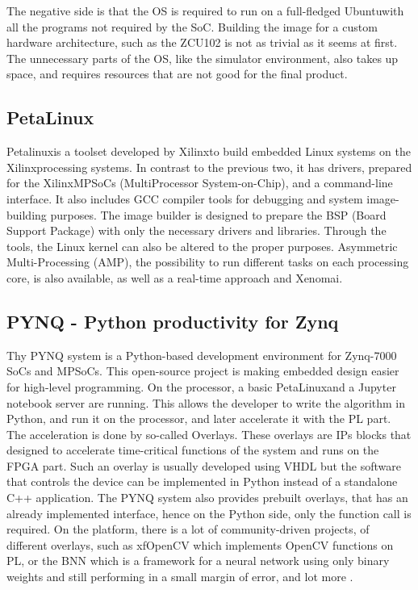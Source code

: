The negative side is that the OS is required to run on a full-fledged Ubuntu\texttrademark with all the programs not required by the SoC.
Building the image for a custom hardware architecture, such as the ZCU102 is not as trivial as it seems at first.
The unnecessary parts of the OS, like the simulator environment, also takes up space, and requires resources that are not good for the final product.

\subsection{PetaLinux} %
Petalinux\texttrademark is a toolset developed by Xilinx\texttrademark to build embedded Linux systems on the Xilinx\texttrademark processing systems.
In contrast to the previous two, it has drivers, prepared for the Xilinx\texttrademark MPSoCs (MultiProcessor System-on-Chip), and a command-line interface. 
It also includes GCC compiler tools for debugging and system image-building purposes.
The image builder is designed to prepare the BSP (Board Support Package) with only the necessary drivers and libraries.
Through the tools, the Linux kernel can also be altered to the proper purposes.
Asymmetric Multi-Processing (AMP), the possibility to run different tasks on each processing core, is also available, as well as a real-time approach and Xenomai\texttrademark \cite{Xenomai}.

\subsection{PYNQ - Python productivity for Zynq} %
Thy PYNQ \cite{pynq} system is a Python-based development environment for Zynq-7000 SoCs and MPSoCs.
This open-source project is making embedded design easier for high-level programming.
On the processor, a basic PetaLinux\texttrademark and a Jupyter\texttrademark \cite{jupyter} notebook server are running.
This allows the developer to write the algorithm in Python, and run it on the processor, and later accelerate it with the PL part.
The acceleration is done by so-called Overlays.
These overlays are IPs blocks that designed to accelerate time-critical functions of the system and runs on the FPGA part.
Such an overlay is usually developed using VHDL but the software that controls the device can be implemented in Python instead of a standalone C++ application.
The PYNQ system also provides prebuilt overlays, that has an already implemented interface, hence on the Python side, only the function call is required.
On the platform, there is a lot of community-driven projects, of different overlays, such as xfOpenCV which implements OpenCV \cite{xfOpenCV_pynq} functions on PL, or the BNN \cite{finn} which is a framework for a neural network using only binary weights and still performing in a small margin of error, and lot more \cite{rybalkin2017hardware}.

